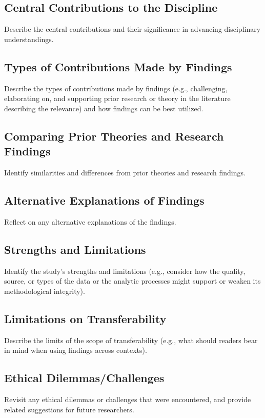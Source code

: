 \documentclass[acmsmall]{acmart}
\begin{document}
\subsection{Central Contributions to the Discipline}

Describe the central contributions and their significance in advancing disciplinary understandings.

\subsection{Types of Contributions Made by Findings}
Describe the types of contributions made by findings (e.g., challenging, elaborating on,
and supporting prior research or theory in the literature describing the relevance) and how
findings can be best utilized.

\subsection{Comparing Prior Theories and Research Findings}
Identify similarities and differences from prior theories and research findings.

\subsection{Alternative Explanations of Findings}
Reflect on any alternative explanations of the findings.

\subsection{Strengths and Limitations}
Identify the study’s strengths and limitations (e.g., consider how the quality, source, or types
of the data or the analytic processes might support or weaken its methodological integrity).

\subsection{Limitations on Transferability}
Describe the limits of the scope of transferability (e.g., what should readers bear in mind
when using findings across contexts).

\subsection{Ethical Dilemmas/Challenges}
Revisit any ethical dilemmas or challenges that were encountered, and provide related suggestions for future researchers.
\end{document}
